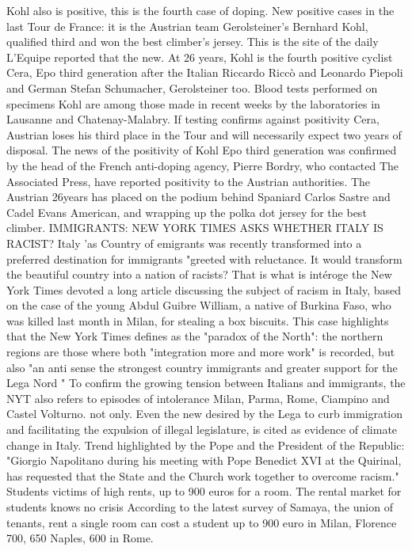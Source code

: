 Kohl also is positive, this is the fourth case of doping.
New positive cases in the last Tour de France: it is the Austrian team Gerolsteiner's Bernhard Kohl, qualified third and won the best climber's jersey.
This is the site of the daily L'Equipe reported that the new.
At 26 years, Kohl is the fourth positive cyclist Cera, Epo third generation after the Italian Riccardo Riccò and Leonardo Piepoli and German Stefan Schumacher, Gerolsteiner too.
Blood tests performed on specimens Kohl are among those made in recent weeks by the laboratories in Lausanne and Chatenay-Malabry.
If testing confirms against positivity Cera, Austrian loses his third place in the Tour and will necessarily expect two years of disposal.
The news of the positivity of Kohl Epo third generation was confirmed by the head of the French anti-doping agency, Pierre Bordry, who contacted The Associated Press, have reported positivity to the Austrian authorities.
The Austrian 26years has placed on the podium behind Spaniard Carlos Sastre and Cadel Evans American, and wrapping up the polka dot jersey for the best climber.
IMMIGRANTS: NEW YORK TIMES ASKS WHETHER ITALY IS RACIST?
Italy 'as Country of emigrants was recently transformed into a preferred destination for immigrants "greeted with reluctance.
It would transform the beautiful country into a nation of racists? That is what is intéroge the New York Times devoted a long article discussing the subject of racism in Italy, based on the case of the young Abdul Guibre William, a native of Burkina Faso, who was killed last month in Milan, for stealing a box biscuits.
This case highlights that the New York Times defines as the "paradox of the North": the northern regions are those where both "integration more and more work" is recorded, but also "an anti sense the strongest country immigrants and greater support for the Lega Nord "
To confirm the growing tension between Italians and immigrants, the NYT also refers to episodes of intolerance Milan, Parma, Rome, Ciampino and Castel Volturno.
not only.
Even the new desired by the Lega to curb immigration and facilitating the expulsion of illegal legislature, is cited as evidence of climate change in Italy.
Trend highlighted by the Pope and the President of the Republic: "Giorgio Napolitano during his meeting with Pope Benedict XVI at the Quirinal, has requested that the State and the Church work together to overcome racism."
Students victims of high rents, up to 900 euros for a room.
The rental market for students knows no crisis
According to the latest survey of Samaya, the union of tenants, rent a single room can cost a student up to 900 euro in Milan, Florence 700, 650 Naples, 600 in Rome.
